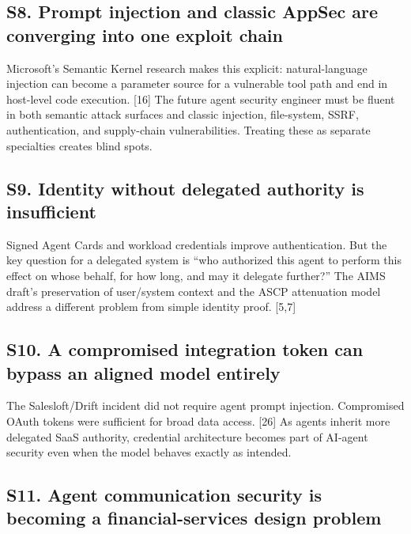 \documentclass[
  10pt,
  letterpaper,
]{article}
\begin{document}
\subsection{S8. Prompt injection and classic AppSec are converging into
one exploit
chain}\label{s8.-prompt-injection-and-classic-appsec-are-converging-into-one-exploit-chain}

Microsoft's Semantic Kernel research makes this explicit:
natural-language injection can become a parameter source for a
vulnerable tool path and end in host-level code execution. {[}16{]} The
future agent security engineer must be fluent in both semantic attack
surfaces and classic injection, file-system, SSRF, authentication, and
supply-chain vulnerabilities. Treating these as separate specialties
creates blind spots.

\subsection{S9. Identity without delegated authority is
insufficient}\label{s9.-identity-without-delegated-authority-is-insufficient}

Signed Agent Cards and workload credentials improve authentication. But
the key question for a delegated system is ``who authorized this agent
to perform this effect on whose behalf, for how long, and may it
delegate further?'' The AIMS draft's preservation of user/system context
and the ASCP attenuation model address a different problem from simple
identity proof. {[}5,7{]}

\subsection{S10. A compromised integration token can bypass an aligned
model
entirely}\label{s10.-a-compromised-integration-token-can-bypass-an-aligned-model-entirely}

The Salesloft/Drift incident did not require agent prompt injection.
Compromised OAuth tokens were sufficient for broad data access. {[}26{]}
As agents inherit more delegated SaaS authority, credential architecture
becomes part of AI-agent security even when the model behaves exactly as
intended.

\subsection{S11. Agent communication security is becoming a
financial-services design
problem}\label{s11.-agent-communication-security-is-becoming-a-financial-services-design-problem}
\end{document}
